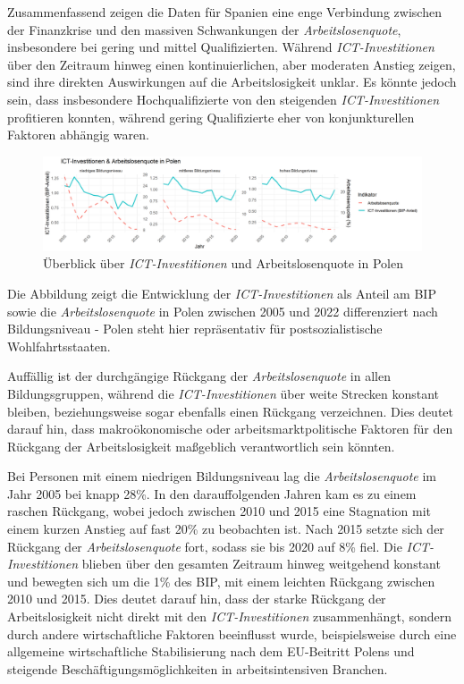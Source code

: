 Zusammenfassend zeigen die Daten für Spanien eine enge Verbindung zwischen der 
Finanzkrise und den massiven Schwankungen der \textit{Arbeitslosenquote}, insbesondere 
bei gering und mittel Qualifizierten. Während \textit{\ac{ICT}-Investitionen} über den 
Zeitraum hinweg einen kontinuierlichen, aber moderaten Anstieg zeigen, sind ihre 
direkten Auswirkungen auf die Arbeitslosigkeit unklar. Es könnte jedoch sein, dass 
insbesondere Hochqualifizierte von den steigenden \textit{\ac{ICT}-Investitionen} 
profitieren konnten, während gering Qualifizierte eher von konjunkturellen 
Faktoren abhängig waren.

\begin{figure}[htbp]
    \centering
    \includegraphics[width=\textwidth]{assets/plot_poland_final.png}
    \caption{Überblick über \textit{\ac{ICT}-Investitionen} und Arbeitslosenquote 
    in Polen}
    \label{fig:poland}
\end{figure}

Die Abbildung zeigt die Entwicklung der \textit{\ac{ICT}-Investitionen} als Anteil 
am BIP sowie die \textit{Arbeitslosenquote} in Polen zwischen 2005 und 2022 
differenziert nach Bildungsniveau - Polen steht hier repräsentativ für 
postsozialistische Wohlfahrtsstaaten.

Auffällig ist der durchgängige Rückgang der \textit{Arbeitslosenquote} in allen 
Bildungsgruppen, während die \textit{\ac{ICT}-Investitionen} über weite Strecken 
konstant bleiben, beziehungsweise sogar ebenfalls einen Rückgang verzeichnen. Dies 
deutet darauf hin, dass makroökonomische oder arbeitsmarktpolitische Faktoren für 
den Rückgang der Arbeitslosigkeit maßgeblich verantwortlich sein könnten.

Bei Personen mit einem niedrigen Bildungsniveau lag die \textit{Arbeitslosenquote} im 
Jahr 2005 bei knapp 28\%. In den darauffolgenden Jahren kam es zu einem raschen Rückgang, 
wobei jedoch zwischen 2010 und 2015 eine Stagnation mit einem kurzen Anstieg auf fast 
20\% zu beobachten ist. Nach 2015 setzte sich der Rückgang der \textit{Arbeitslosenquote}  
fort, sodass sie bis 2020 auf 8\% fiel. Die \textit{\ac{ICT}-Investitionen} blieben 
über den gesamten Zeitraum hinweg weitgehend konstant und bewegten sich um die 1\% des 
BIP, mit einem leichten Rückgang zwischen 2010 und 2015. Dies deutet darauf hin, dass  
der starke Rückgang der Arbeitslosigkeit nicht direkt mit den 
\textit{\ac{ICT}-Investitionen} zusammenhängt, sondern durch andere wirtschaftliche 
Faktoren beeinflusst wurde, beispielsweise durch eine allgemeine wirtschaftliche 
Stabilisierung nach dem EU-Beitritt Polens und steigende Beschäftigungsmöglichkeiten 
in arbeitsintensiven Branchen.

